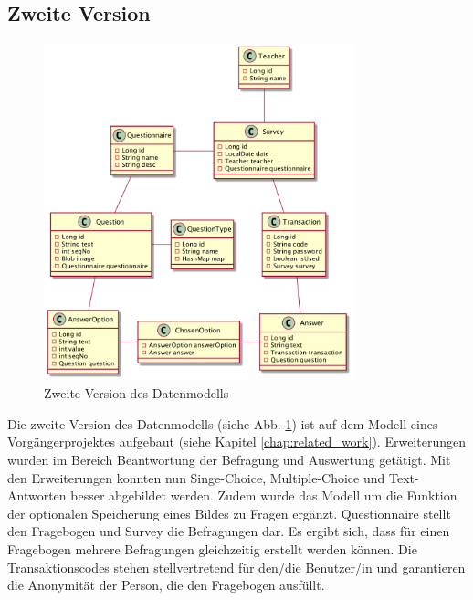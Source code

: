 \subsection{Zweite Version}
\begin{figure}[H]
    \includegraphics[width=0.8\textwidth]{pics/Datenmodel_Version2.png}
    \centering
    \caption{Zweite Version des Datenmodells}
    \label{fig:cld3}
\end{figure}
Die zweite Version des Datenmodells (siehe Abb. \ref{fig:cld3}) ist auf dem Modell eines Vorgängerprojektes aufgebaut 
(siehe Kapitel \ref{chap:related_work}). 
Erweiterungen wurden im Bereich Beantwortung der Befragung und Auswertung getätigt.
Mit den Erweiterungen konnten nun Singe-Choice, Multiple-Choice und Text-Antworten besser abgebildet werden.
Zudem wurde das Modell um die Funktion der optionalen Speicherung eines Bildes zu Fragen ergänzt.
\newline
\newline
Questionnaire stellt den Fragebogen und Survey die Befragungen dar. Es ergibt sich, dass für einen 
Fragebogen mehrere Befragungen gleichzeitig erstellt werden können.
Die Transaktionscodes stehen stellvertretend für den/die Benutzer/in und garantieren die Anonymität der Person, die den 
Fragebogen ausfüllt.

